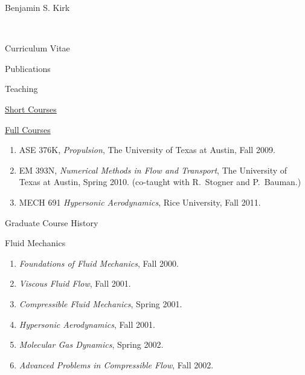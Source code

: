 \documentclass[10pt]{report}
\begin{document}
\begin{cv}{\centerline{\Large Benjamin S. Kirk}\\
    \centerline{\large Curriculum Vitae}}
\begin{cvlist}{Publications}

    \end{cvlist}

  \begin{cvlist}{Teaching}

    \item[\underline{Short Courses}]    

    \vspace{1em}
    \item[\underline{Full Courses}]
      \begin{enumerate}
        \item ASE 376K, \emph{Propulsion}, The University of Texas at Austin, Fall 2009.
        \item EM 393N, \emph{Numerical Methods in Flow and Transport}, The University of Texas at Austin, Spring 2010. (co-taught with R.~Stogner and P.~Bauman.)
        \item MECH 691 \emph{Hypersonic Aerodynamics}, Rice University, Fall 2011.
      \end{enumerate}
  \end{cvlist}


  \begin{cvlist}{Graduate Course History}
      \item[Fluid Mechanics]

	\begin{enumerate}
  	  \item \emph{Foundations of Fluid Mechanics}, Fall 2000.
	  \item \emph{Viscous Fluid Flow}, Fall 2001.
	  \item \emph{Compressible Fluid Mechanics}, Spring 2001.
	  \item \emph{Hypersonic Aerodynamics}, Fall 2001.
	  \item \emph{Molecular Gas Dynamics}, Spring 2002.
	  \item \emph{Advanced Problems in Compressible Flow}, Fall 2002.
	\end{enumerate}


\end{cvlist}
\end{cv}
\end{document}
